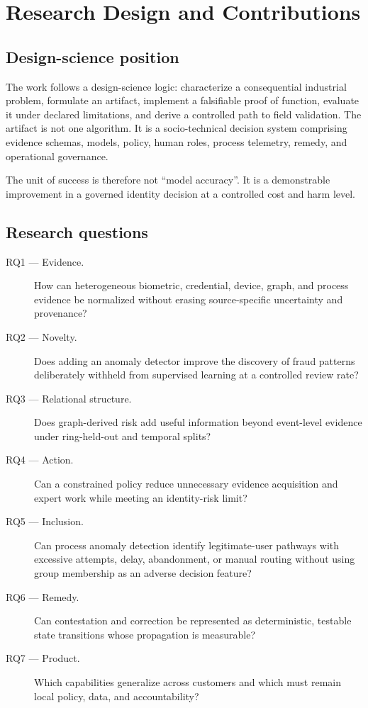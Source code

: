 \chapter{Research Design and Contributions}

\section{Design-science position}

The work follows a design-science logic: characterize a consequential industrial problem, formulate an artifact, implement a falsifiable proof of function, evaluate it under declared limitations, and derive a controlled path to field validation. The artifact is not one algorithm. It is a socio-technical decision system comprising evidence schemas, models, policy, human roles, process telemetry, remedy, and operational governance.

The unit of success is therefore not ``model accuracy''. It is a demonstrable improvement in a governed identity decision at a controlled cost and harm level.

\section{Research questions}

\begin{description}
\item[RQ1 --- Evidence.] How can heterogeneous biometric, credential, device, graph, and process evidence be normalized without erasing source-specific uncertainty and provenance?
\item[RQ2 --- Novelty.] Does adding an anomaly detector improve the discovery of fraud patterns deliberately withheld from supervised learning at a controlled review rate?
\item[RQ3 --- Relational structure.] Does graph-derived risk add useful information beyond event-level evidence under ring-held-out and temporal splits?
\item[RQ4 --- Action.] Can a constrained policy reduce unnecessary evidence acquisition and expert work while meeting an identity-risk limit?
\item[RQ5 --- Inclusion.] Can process anomaly detection identify legitimate-user pathways with excessive attempts, delay, abandonment, or manual routing without using group membership as an adverse decision feature?
\item[RQ6 --- Remedy.] Can contestation and correction be represented as deterministic, testable state transitions whose propagation is measurable?
\item[RQ7 --- Product.] Which capabilities generalize across customers and which must remain local policy, data, and accountability?
\end{description}

